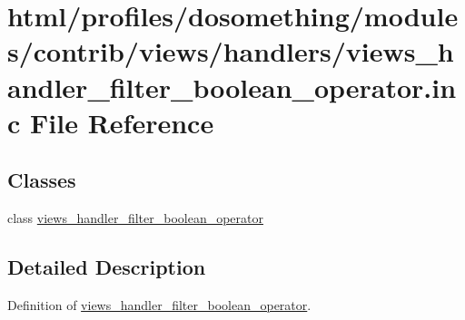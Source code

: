 \hypertarget{views__handler__filter__boolean__operator_8inc}{
\section{html/profiles/dosomething/modules/contrib/views/handlers/views\_\-handler\_\-filter\_\-boolean\_\-operator.inc File Reference}
\label{views__handler__filter__boolean__operator_8inc}
}
\subsection*{Classes}
\begin{DoxyCompactItemize}
\item 
class \hyperlink{classviews__handler__filter__boolean__operator}{views\_\-handler\_\-filter\_\-boolean\_\-operator}
\end{DoxyCompactItemize}


\subsection{Detailed Description}
Definition of \hyperlink{classviews__handler__filter__boolean__operator}{views\_\-handler\_\-filter\_\-boolean\_\-operator}. 
